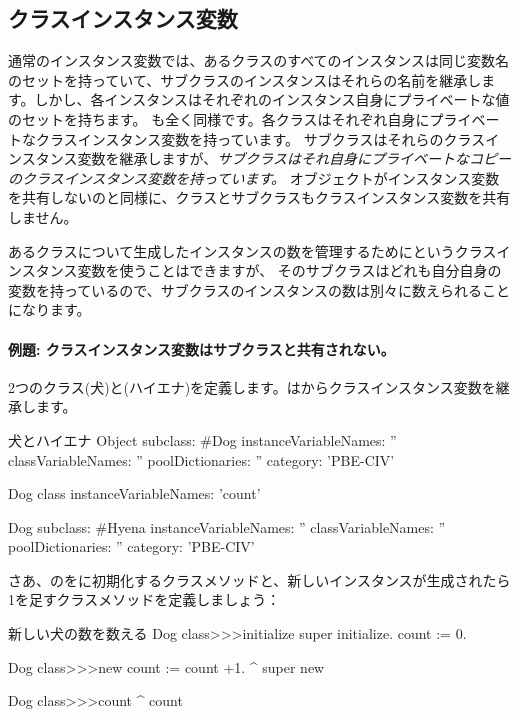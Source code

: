 \documentclass[a4paper,10pt,twoside]{book}
\begin{document}
\subsection{クラスインスタンス変数}
通常のインスタンス変数では、あるクラスのすべてのインスタンスは同じ変数名のセットを持っていて、サブクラスのインスタンスはそれらの名前を継承します。しかし、各インスタンスはそれぞれのインスタンス自身にプライベートな値のセットを持ちます。
も全く同様です。各クラスはそれぞれ自身にプライベートなクラスインスタンス変数を持っています。
サブクラスはそれらのクラスインスタンス変数を継承しますが、\emph{サブクラスはそれ自身にプライベートなコピーのクラスインスタンス変数を持っています。}
オブジェクトがインスタンス変数を共有しないのと同様に、クラスとサブクラスもクラスインスタンス変数を共有しません。

あるクラスについて生成したインスタンスの数を管理するためにというクラスインスタンス変数を使うことはできますが、
そのサブクラスはどれも自分自身の変数を持っているので、サブクラスのインスタンスの数は別々に数えられることになります。

\paragraph{例題: クラスインスタンス変数はサブクラスと共有されない。}
2つのクラス(犬)と(ハイエナ)を定義します。はからクラスインスタンス変数を継承します。

\begin{classdef}[dog]{犬とハイエナ}
Object subclass: #Dog
	instanceVariableNames: ''
	classVariableNames: ''
	poolDictionaries: ''
	category: 'PBE-CIV'

Dog class
	instanceVariableNames: 'count'

Dog subclass: #Hyena
	instanceVariableNames: ''
	classVariableNames: ''
	poolDictionaries: ''
	category: 'PBE-CIV'
\end{classdef}

さあ、のをに初期化するクラスメソッドと、新しいインスタンスが生成されたら1を足すクラスメソッドを定義しましょう：

\begin{method}[dogcount]{新しい犬の数を数える}
Dog class>>>initialize
	super initialize.
	count := 0.

Dog class>>>new
	count := count +1.
	^ super new

Dog class>>>count
	^ count
\end{method}
\end{document}
